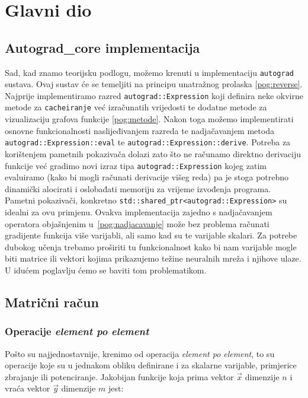 \documentclass[zavrsnirad]{fer}
\begin{document}
\chapter{Glavni dio}
\label{pog:glavni_dio}

\section{Autograd\_core implementacija}
Sad, kad znamo teorijsku podlogu, možemo krenuti u implementaciju \texttt{autograd} sustava. Ovaj sustav će se temeljiti na principu unatražnog prolaska \ref{pog:reverse}. Najprije implementiramo razred \texttt{autograd::Expression} koji definira neke okvirne metode za \texttt{cacheiranje} već izračunatih vrijedosti te dodatne metode za vizualizaciju grafova funkcije \ref{pog:metode}. Nakon toga možemo implementirati osnovne funkcionalnosti naslijeđivanjem razreda te nadjačavanjem metoda \texttt{autograd::Expression::eval} te \texttt{autograd::Expression::derive}. Potreba za korištenjem pametnih pokazivača dolazi zato što ne računamo direktno derivaciju funkcije već gradimo novi izraz tipa \texttt{autograd::Expression} kojeg zatim evaluiramo (kako bi mogli računati derivacije višeg reda) pa je stoga potrebno dinamički alocirati i oslobađati memoriju za vrijeme izvođenja programa. Pametni pokazivači, konkretno \texttt{std::shared\_ptr<autograd::Expression>} su idealni za ovu primjenu. Ovakva implementacija zajedno s nadjačavanjem operatora objašnjenim u~\ref{pog:nadjacavanje} može bez problema računati gradijente funkcija više varijabli, ali samo kad su te varijable skalari. Za potrebe dubokog učenja trebamo proširiti tu funkcionalnost kako bi nam varijable mogle biti matrice ili vektori kojima prikazujemo težine neuralnih mreža i njihove ulaze. U idućem poglavlju ćemo se baviti tom problematikom.



\pagebreak
\section{Matrični račun}
\subsection{Operacije \textit{element po element}}
Pošto su najjednostavnije, krenimo od operacija \textit{element po element}, to su operacije koje su u jednakom obliku definirane i za skalarne varijable, primjerice zbrajanje ili potenciranje. Jakobijan funkcije koja prima vektor $\vec{x}$ dimenzije $n$ i vraća vektor $\vec{y}$ dimenzije $m$ jest:
\end{document}
